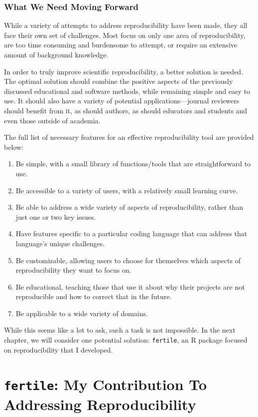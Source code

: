 \documentclass[12pt,twoside]{reedthesis}
\providecommand{\tightlist}{%
  \setlength{\itemsep}{0pt}\setlength{\parskip}{0pt}}
\begin{document}
\hypertarget{what-we-need-moving-forward}{%
\subsection{What We Need Moving Forward}\label{what-we-need-moving-forward}}

While a variety of attempts to address reproducibility have been made, they all face their own set of challenges. Most focus on only one area of reproducibility, are too time consuming and burdensome to attempt, or require an extensive amount of background knowledge.

In order to truly improve scientific reproducibility, a better solution is needed. The optimal solution should combine the positive aspects of the previously discussed educational and software methods, while remaining simple and easy to use. It should also have a variety of potential applications---journal reviewers should benefit from it, as should authors, as should educators and students and even those outside of academia.

The full list of necessary features for an effective reproducibility tool are provided below:
\begin{enumerate}
\def\labelenumi{\arabic{enumi})}
\tightlist
\item
  Be simple, with a small library of functions/tools that are straightforward to use.
\item
  Be accessible to a variety of users, with a relatively small learning curve.
\item
  Be able to address a wide variety of aspects of reproducibility, rather than just one or two key issues.
\item
  Have features specific to a particular coding language that can address that language's unique challenges.
\item
  Be customizable, allowing users to choose for themselves which aspects of reproducibility they want to focus on.
\item
  Be educational, teaching those that use it about why their projects are not reproducible and how to correct that in the future.
\item
  Be applicable to a wide variety of domains.
\end{enumerate}
While this seems like a lot to ask, such a task is not impossible. In the next chapter, we will consider one potential solution: \texttt{fertile}, an R package focused on reproducibility that I developed.

\hypertarget{my-solution}{%
\chapter{\texorpdfstring{\texttt{fertile}: My Contribution To Addressing Reproducibility}{fertile: My Contribution To Addressing Reproducibility}}\label{my-solution}}
\end{document}

